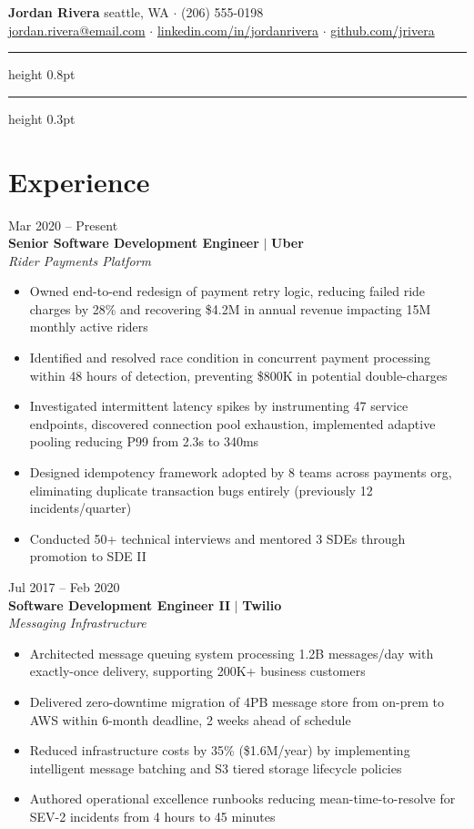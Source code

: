\documentclass[11pt,letterpaper]{article}
\begin{document}
{\Large \textbf{Jordan Rivera}} \hfill {\small seattle, WA $\cdot$ (206) 555-0198} \\
{\small \href{mailto:jordan.rivera@email.com}{jordan.rivera@email.com} $\cdot$ \href{https://linkedin.com/in/jordanrivera}{linkedin.com/in/jordanrivera} $\cdot$ \href{https://github.com/jrivera}{github.com/jrivera}}

\vspace{6pt}\hrule height 0.8pt\vspace{2pt}\hrule height 0.3pt

\section{Experience}

{\color{accent}\small Mar 2020 -- Present} \hfill \\[-12pt]

\textbf{Senior Software Development Engineer} $\mid$ \textbf{Uber} \\
\textit{Rider Payments Platform}
\begin{itemize}
    \item Owned end-to-end redesign of payment retry logic, reducing failed ride charges by 28\% and recovering \$4.2M in annual revenue impacting 15M monthly active riders
    \item Identified and resolved race condition in concurrent payment processing within 48 hours of detection, preventing \$800K in potential double-charges
    \item Investigated intermittent latency spikes by instrumenting 47 service endpoints, discovered connection pool exhaustion, implemented adaptive pooling reducing P99 from 2.3s to 340ms
    \item Designed idempotency framework adopted by 8 teams across payments org, eliminating duplicate transaction bugs entirely (previously 12 incidents/quarter)
    \item Conducted 50+ technical interviews and mentored 3 SDEs through promotion to SDE II
\end{itemize}

{\color{accent}\small Jul 2017 -- Feb 2020} \hfill \\[-12pt]

\textbf{Software Development Engineer II} $\mid$ \textbf{Twilio} \\
\textit{Messaging Infrastructure}
\begin{itemize}
    \item Architected message queuing system processing 1.2B messages/day with exactly-once delivery, supporting 200K+ business customers
    \item Delivered zero-downtime migration of 4PB message store from on-prem to AWS within 6-month deadline, 2 weeks ahead of schedule
    \item Reduced infrastructure costs by 35\% (\$1.6M/year) by implementing intelligent message batching and S3 tiered storage lifecycle policies
    \item Authored operational excellence runbooks reducing mean-time-to-resolve for SEV-2 incidents from 4 hours to 45 minutes
\end{itemize}
\end{document}
